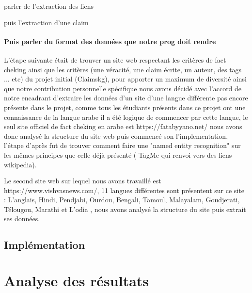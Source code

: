 \documentclass[oneside,13pt,a4paper]{report}
\begin{document}
parler de l'extraction des liens

puis l'extraction d'une claim

\subsubsection*{Puis parler du format des données que notre prog doit rendre}

L'étape suivante était de trouver un site web respectant les critères de fact cheking ainsi que les critères (une véracité, une claim écrite, un auteur, des tags ... etc) du projet initial (Claimskg), pour apporter un maximum de diversité ainsi que notre contribution personnelle spécifique nous avons décidé avec l'accord de notre encadrant d'extraire les données d'un site d'une langue différente pas encore présente dans le projet, comme tous les étudiants présents dans ce projet ont une connaissance de la langue arabe il a été logique de commencer par cette langue, le seul site officiel de fact cheking en arabe est https://fatabyyano.net/ nous avons donc analysé la structure du site web puis commencé son l'implementation, l'étape d'après fut de trouver comment faire une "named entity recognition" sur les mêmes principes que celle déjà présenté ( TagMe qui renvoi vers des liens wikipedia).

Le second site web sur lequel nous avons travaillé est https://www.vishvasnews.com/, 11 langues différentes sont présentent sur ce site : L'anglais, Hindi, Pendjabi, Ourdou, Bengali, Tamoul, Malayalam, Goudjerati, Télougou, Marathi et L'odia , nous avons analysé la structure du site puis extrait ses données.

\section{Implémentation}

\chapter{Analyse des résultats}
\end{document}
